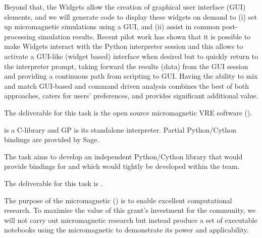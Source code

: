 \begin{workpackage}
\begin{tasklist}
\begin{task}[lead=USO,title=Case study: micromagnetic VRE built from
  \TheProject,id=oommf-py-ipython-attributes,PM=6,partners={SR,USH},wphases=9-15]
  Beyond that, the \Jupyter Widgets allow the creation of graphical
  user interface (GUI) elements, and we will generate code to display
  these widgets on demand to (i) set up micromagnetic simulations
  using a GUI, and (ii) assist in common post-processing simulation
  results. Recent pilot work has shown that it is possible to make
  \Jupyter Widgets interact with the Python interpreter session and
  this allows to activate a GUI-like (widget based) interface when
  desired but to quickly return to the interpreter prompt, taking
  forward the results (data) from the GUI session
  \cite{IPython-widget-GUI-demo-youtube-2014} and providing a
  continuous path from scripting to GUI. Having the ability to mix and
  match GUI-based and command driven analysis combines the best of
  both approaches, caters for users' preferences, and provides
  significant additional value.

  The deliverable for this task is the open source micromagnetic VRE
  software ().
\end{task}

\begin{task}[lead=UB,title=Python/Cython bindings for Pari,PM=16,id=pari-python,wphases=0-24]

  \Pari is a C-library and GP is its standalone interpreter. Partial
  Python/Cython bindings are provided by Sage.

  The task aims to develop an independent Python/Cython library that
  would provide bindings for \PariGP and which would tightly be
  developed within the \PariGP team.

  The deliverable for this task is .
\end{task}

\begin{task}[lead=USO,title=Demonstrator: micromagnetic VRE notebooks,
  id=oommf-tutorial-and-documentation,PM=6,partners={SR,PS},wphases=15-21]

  The purpose of the micromagnetic \VRE
  () is to enable excellent
  computational research. To maximise the value of this grant's
  investment for the community, we will not carry out micromagnetic
  research but instead produce a set of executable notebooks using the
  micromagnetic \VRE to demonstrate its power and applicability.


\end{task}
\end{tasklist}
\end{workpackage}
